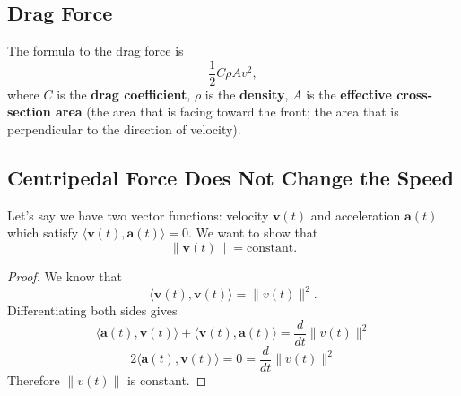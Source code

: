 \documentclass[12pt,a4paper]{report}
\begin{document}
  \subsection*{Drag Force}
  The formula to the drag force is
  \[\frac 1 2 C \rho A v^2,\]
  where \(C\) is the \textbf{drag coefficient}, \(\rho\) is the \textbf{density}, \(A\) is the \textbf{effective cross-section area} (the area that is facing toward the front; the area that is perpendicular to the direction of velocity).

  \subsection*{Centripedal Force Does Not Change the Speed}
  Let's say we have two vector functions: velocity \(\mathbf v(t)\) and acceleration \(\mathbf a(t)\) which satisfy \(\langle \mathbf v(t), \mathbf a(t)\rangle = 0\). We want to show that
  \[\|\mathbf v(t)\| = \text{constant}.\]
  
  \begin{proof}
    We know that
    \[\langle \mathbf v(t), \mathbf v(t)\rangle = \|v(t)\|^2.\]
    Differentiating both sides gives
    \[\langle \mathbf a(t), \mathbf v(t)\rangle + \langle \mathbf v(t), \mathbf a(t)\rangle = \frac{d}{dt}\|v(t)\|^2\]
    \[2\langle \mathbf a(t), \mathbf v(t)\rangle = 0 = \frac{d}{dt}\|v(t)\|^2\]
    Therefore \(\|v(t)\|\) is constant. 
  \end{proof}
\end{document}
